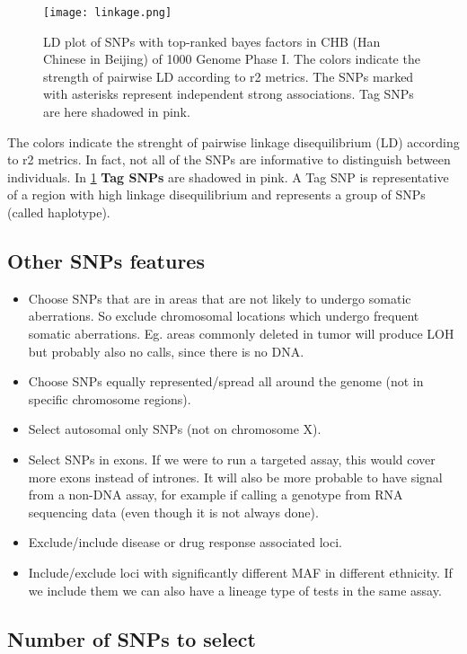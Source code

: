 \begin{figure}[H]
	\texttt{[image: linkage.png]}
	\caption{\label{fig:linkage}LD plot of SNPs with top-ranked bayes factors in CHB (Han Chinese in Beijing) of 1000 Genome Phase I. The colors indicate the
strength of pairwise LD according to r2 metrics. The SNPs marked with asterisks represent independent strong associations. Tag SNPs are here shadowed in pink.}
\end{figure}

The colors indicate the strenght of pairwise linkage disequilibrium (LD) according to r2 metrics. In fact, not all of the SNPs are informative to distinguish between individuals.
In \ref{fig:linkage} \textbf{Tag SNPs} are shadowed in pink. A Tag SNP is representative of a region with high linkage disequilibrium and represents a group of SNPs (called haplotype).


\subsection{Other SNPs features}
\begin{itemize}
	\item Choose SNPs that are in areas that are not likely to undergo somatic aberrations. So exclude chromosomal locations which undergo frequent somatic aberrations. Eg. areas commonly deleted in tumor will produce LOH but probably also no calls, since there is no DNA.
	\item Choose SNPs equally represented/spread all around the genome (not in specific chromosome regions).
	\item Select autosomal only SNPs (not on chromosome X).
	\item Select SNPs in exons. If we were to run a targeted assay, this would cover more exons instead of intrones. It will also be more probable to have signal from a non-DNA assay, for example if calling a genotype from RNA sequencing data (even though it is not always done).
	\item Exclude/include disease or drug response associated loci.
	\item Include/exclude loci with significantly different MAF in different ethnicity. If we include them we can also have a lineage type of tests in the same assay.
\end{itemize}


\subsection{Number of SNPs to select}

